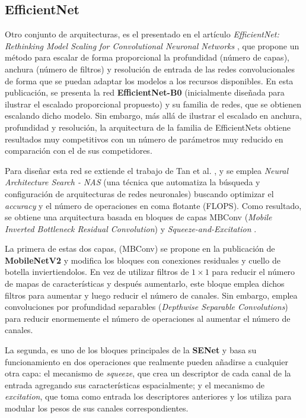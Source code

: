 

\subsection{EfficientNet}\label{efficientnet}
Otro conjunto de arquitecturas, es el presentado en el artículo \textit{EfficientNet: Rethinking Model Scaling for Convolutional Neuronal Networks} \cite{efficientnet}, que propone un método para escalar de forma proporcional la profundidad (número de capas), anchura (número de filtros) y resolución de entrada de las redes convolucionales de forma que se puedan adaptar los modelos a los recursos disponibles. En esta publicación, se presenta la red \textbf{EfficientNet-B0} (inicialmente diseñada para ilustrar el escalado proporcional propuesto) y su familia de redes, que se obtienen escalando dicho modelo. Sin embargo, más allá de ilustrar el escalado en anchura, profundidad y resolución, la arquitectura de la familia de EfficientNets obtiene resultados muy competitivos con un número de parámetros muy reducido en comparación con el de sus competidores.

Para diseñar esta red se extiende el trabajo de Tan et al. \cite{mnasnet}, y se emplea \textit{Neural Architecture Search - NAS} (una técnica que automatiza la búsqueda y configuración de arquitecturas de redes neuronales) buscando optimizar el \textit{accuracy} y el número de operaciones en coma flotante (FLOPS). Como resultado, se obtiene una arquitectura basada en bloques de capas MBConv (\textit{Mobile Inverted Bottleneck Residual Convolution}) \cite{mobilenetv2} y \textit{Squeeze-and-Excitation} \cite{senet}.

La primera de estas dos capas, (MBConv) se propone en la publicación de \textbf{MobileNetV2} \cite{mobilenetv2} y modifica los bloques con conexiones residuales y cuello de botella inviertiendolos. En vez de utilizar filtros de $1\times1$ para reducir el número de mapas de características y después aumentarlo, este bloque emplea dichos filtros para aumentar y luego reducir el número de canales. Sin embargo, emplea convoluciones por profundidad separables (\textit{Depthwise Separable Convolutions}) para reducir enormemente el número de operaciones al aumentar el número de canales. 

La segunda, es uno de los bloques principales de la \textbf{SENet} \cite{senet} y basa su funcionamiento en dos operaciones que realmente pueden añadirse a cualquier otra capa: el mecanismo de \textit{squeeze}, que crea un descriptor de cada canal de la entrada agregando sus características espacialmente; y el mecanismo de \textit{excitation}, que toma como entrada los descriptores anteriores y los utiliza para modular los pesos de sus canales correspondientes.

